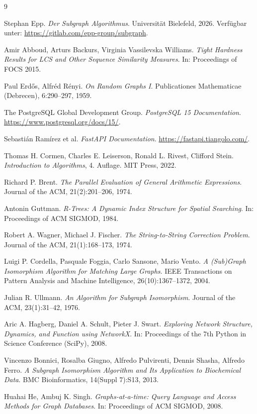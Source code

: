 \documentclass[a4paper,12pt]{article}
\theoremstyle{definition}
\begin{document}
\begin{thebibliography}{9}

Stephan Epp.
\emph{Der Subgraph Algorithmus}.
Universität Bielefeld, 2026.
Verfügbar unter: \url{https://gitlab.com/epp-group/subgraph}.

Amir Abboud, Arturs Backurs, Virginia Vassilevska Williams.
\emph{Tight Hardness Results for LCS and Other Sequence Similarity Measures}.
In: Proceedings of FOCS 2015.

Paul Erdős, Alfréd Rényi.
\emph{On Random Graphs I}.
Publicationes Mathematicae (Debrecen), 6:290--297, 1959.

The PostgreSQL Global Development Group.
\emph{PostgreSQL 15 Documentation}.
\url{https://www.postgresql.org/docs/15/}.

Sebastián Ramírez et al.
\emph{FastAPI Documentation}.
\url{https://fastapi.tiangolo.com/}.

Thomas H. Cormen, Charles E. Leiserson, Ronald L. Rivest, Clifford Stein.
\emph{Introduction to Algorithms}, 4. Auflage.
MIT Press, 2022.

Richard P. Brent.
\emph{The Parallel Evaluation of General Arithmetic Expressions}.
Journal of the ACM, 21(2):201--206, 1974.

Antonin Guttman.
\emph{R-Trees: A Dynamic Index Structure for Spatial Searching}.
In: Proceedings of ACM SIGMOD, 1984.

Robert A. Wagner, Michael J. Fischer.
\emph{The String-to-String Correction Problem}.
Journal of the ACM, 21(1):168--173, 1974.

Luigi P. Cordella, Pasquale Foggia, Carlo Sansone, Mario Vento.
\emph{A (Sub)Graph Isomorphism Algorithm for Matching Large Graphs}.
IEEE Transactions on Pattern Analysis and Machine Intelligence, 26(10):1367--1372, 2004.

Julian R. Ullmann.
\emph{An Algorithm for Subgraph Isomorphism}.
Journal of the ACM, 23(1):31--42, 1976.

Aric A. Hagberg, Daniel A. Schult, Pieter J. Swart.
\emph{Exploring Network Structure, Dynamics, and Function using NetworkX}.
In: Proceedings of the 7th Python in Science Conference (SciPy), 2008.

Vincenzo Bonnici, Rosalba Giugno, Alfredo Pulvirenti, Dennis Shasha, Alfredo Ferro.
\emph{A Subgraph Isomorphism Algorithm and Its Application to Biochemical Data}.
BMC Bioinformatics, 14(Suppl 7):S13, 2013.

Huahai He, Ambuj K. Singh.
\emph{Graphs-at-a-time: Query Language and Access Methods for Graph Databases}.
In: Proceedings of ACM SIGMOD, 2008.

\end{thebibliography}
\end{document}
